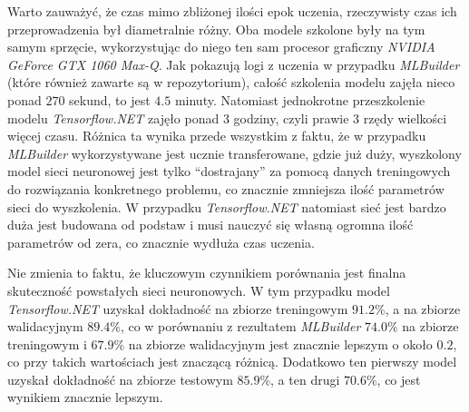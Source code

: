 Warto zauważyć, że czas mimo zbliżonej ilości epok uczenia, rzeczywisty czas ich przeprowadzenia był diametralnie różny.
Oba modele szkolone były na tym samym sprzęcie, wykorzystując do niego ten sam procesor graficzny \emph{NVIDIA GeForce GTX 1060 Max-Q}.
Jak pokazują logi z uczenia w przypadku \emph{MLBuilder} (które również zawarte są w repozytorium), całość szkolenia modelu zajęła nieco ponad $270$ sekund, to jest $4.5$ minuty.
Natomiast jednokrotne przeszkolenie modelu \emph{Tensorflow.NET} zajęło ponad 3 godziny, czyli prawie 3 rzędy wielkości więcej czasu.
Różnica ta wynika przede wszystkim z faktu, że w przypadku \emph{MLBuilder} wykorzystywane jest ucznie transferowane, gdzie już duży, wyszkolony model sieci neuronowej jest tylko ``dostrajany'' za pomocą danych treningowych do rozwiązania konkretnego problemu, co znacznie zmniejsza ilość parametrów sieci do wyszkolenia.
W przypadku \emph{Tensorflow.NET} natomiast sieć jest bardzo duża jest budowana od podstaw i musi nauczyć się własną ogromna ilość parametrów od zera, co znacznie wydłuża czas uczenia.

Nie zmienia to faktu, że kluczowym czynnikiem porównania jest finalna skuteczność powstałych sieci neuronowych.
W tym przypadku model \emph{Tensorflow.NET} uzyskał dokładność na zbiorze treningowym $91.2\%$, a na zbiorze walidacyjnym $89.4\%$, co w porównaniu z rezultatem \emph{MLBuilder} $74.0\%$ na zbiorze treningowym i $67.9\%$ na zbiorze walidacyjnym jest znacznie lepszym o około $0.2$, co przy takich wartościach jest znaczącą różnicą.
Dodatkowo ten pierwszy model uzyskał dokładność na zbiorze testowym $85.9\%$, a ten drugi $70.6\%$, co jest wynikiem znacznie lepszym.

